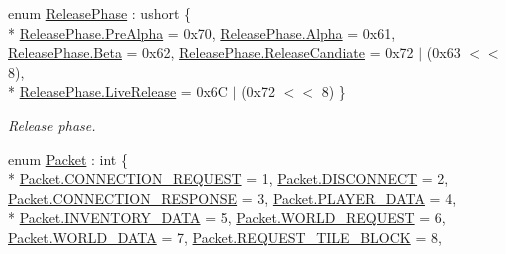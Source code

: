 \begin{DoxyCompactItemize}
\item 
enum \hyperlink{namespace_o_t_a_a9ad7402101346ae887e86cbc90cadc77}{Release\+Phase} \+: ushort \{ \\*
\hyperlink{namespace_o_t_a_a9ad7402101346ae887e86cbc90cadc77ad31ee59ae635027030f12467a70eaae5}{Release\+Phase.\+Pre\+Alpha} = 0x70, 
\hyperlink{namespace_o_t_a_a9ad7402101346ae887e86cbc90cadc77a6132295fcf5570fb8b0a944ef322a598}{Release\+Phase.\+Alpha} = 0x61, 
\hyperlink{namespace_o_t_a_a9ad7402101346ae887e86cbc90cadc77a0b87d66b88c72957dfea8c9605016442}{Release\+Phase.\+Beta} = 0x62, 
\hyperlink{namespace_o_t_a_a9ad7402101346ae887e86cbc90cadc77adc03a1b1f6f2d55a21ea07cea0a93ea9}{Release\+Phase.\+Release\+Candiate} = 0x72 $\vert$ (0x63 $<$$<$ 8), 
\\*
\hyperlink{namespace_o_t_a_a9ad7402101346ae887e86cbc90cadc77afad48f18ebc2c9841e73117ad3c48eb5}{Release\+Phase.\+Live\+Release} = 0x6\+C $\vert$ (0x72 $<$$<$ 8)
 \}\begin{DoxyCompactList}\small\item\em Release phase. \end{DoxyCompactList}
\item 
enum \hyperlink{namespace_o_t_a_a77ae6c8a87d7ca2999a6f5a97f90f46d}{Packet} \+: int \{ \\*
\hyperlink{namespace_o_t_a_a77ae6c8a87d7ca2999a6f5a97f90f46da86f7dd9c5977cdd34a72a5e9e4371205}{Packet.\+C\+O\+N\+N\+E\+C\+T\+I\+O\+N\+\_\+\+R\+E\+Q\+U\+E\+S\+T} = 1, 
\hyperlink{namespace_o_t_a_a77ae6c8a87d7ca2999a6f5a97f90f46dadd7cd0eb57db08d4f98abc48e5593462}{Packet.\+D\+I\+S\+C\+O\+N\+N\+E\+C\+T} = 2, 
\hyperlink{namespace_o_t_a_a77ae6c8a87d7ca2999a6f5a97f90f46da7b394615999d40276b3d04143d07189a}{Packet.\+C\+O\+N\+N\+E\+C\+T\+I\+O\+N\+\_\+\+R\+E\+S\+P\+O\+N\+S\+E} = 3, 
\hyperlink{namespace_o_t_a_a77ae6c8a87d7ca2999a6f5a97f90f46daa4e994a8ced29aee2699b388710eab78}{Packet.\+P\+L\+A\+Y\+E\+R\+\_\+\+D\+A\+T\+A} = 4, 
\\*
\hyperlink{namespace_o_t_a_a77ae6c8a87d7ca2999a6f5a97f90f46dad9171032a4e50edb4b01a8b5e106a31f}{Packet.\+I\+N\+V\+E\+N\+T\+O\+R\+Y\+\_\+\+D\+A\+T\+A} = 5, 
\hyperlink{namespace_o_t_a_a77ae6c8a87d7ca2999a6f5a97f90f46da44bafd2d8f27236e14864149aa854d2d}{Packet.\+W\+O\+R\+L\+D\+\_\+\+R\+E\+Q\+U\+E\+S\+T} = 6, 
\hyperlink{namespace_o_t_a_a77ae6c8a87d7ca2999a6f5a97f90f46dae3a1349f2d78fd1535fef868bd25bd82}{Packet.\+W\+O\+R\+L\+D\+\_\+\+D\+A\+T\+A} = 7, 
\hyperlink{namespace_o_t_a_a77ae6c8a87d7ca2999a6f5a97f90f46da2f3224b9de59ec89add934a4a5765772}{Packet.\+R\+E\+Q\+U\+E\+S\+T\+\_\+\+T\+I\+L\+E\+\_\+\+B\+L\+O\+C\+K} = 8, 

\end{DoxyCompactItemize}
